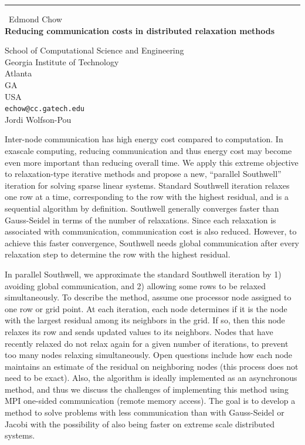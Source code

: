 \documentclass{report}
\begin{document}
\begin{center}
\rule{6in}{1pt} \
{\large Edmond Chow \\
{\bf Reducing communication costs in distributed relaxation methods}}

School of Computational Science and Engineering \\ Georgia Institute of Technology \\ Atlanta \\ GA \\ USA
\\
{\tt echow@cc.gatech.edu}\\
Jordi Wolfson-Pou\end{center}

Inter-node communication has high energy cost compared to computation.
In exascale computing, reducing communication and thus energy cost may
become even more important than reducing overall time. We apply this
extreme objective to relaxation-type iterative methods and propose a new,
``parallel Southwell'' iteration for solving sparse linear systems.
Standard Southwell iteration relaxes one row at a time, corresponding
to the row with the highest residual, and is a sequential algorithm by
definition. Southwell generally converges faster than Gauss-Seidel in
terms of the number of relaxations. Since each relaxation is associated with
communication, communication cost is also reduced. However, to achieve
this faster convergence, Southwell needs global communication after
every relaxation step to determine the row with the highest residual.

In parallel Southwell, we approximate the standard Southwell iteration
by 1) avoiding global communication, and 2) allowing some rows to be
relaxed simultaneously. To describe the method, assume one processor
node assigned to one row or grid point. At each iteration, each node
determines if it is the node with the largest residual among its
neighbors in the grid. If so, then this node relaxes its row and sends
updated values to its neighbors. Nodes that have recently relaxed
do not relax again for a given number of iterations, to prevent too
many nodes relaxing simultaneously. Open questions include how each
node maintains an estimate of the residual on neighboring nodes (this
process does not need to be exact). Also, the algorithm is ideally
implemented as an asynchronous method, and thus we discuss the challenges
of implementing this method using MPI one-sided communication (remote
memory access). The goal is to develop a method to solve problems with
less communication than with Gauss-Seidel or Jacobi with the possibility
of also being faster on extreme scale distributed systems.
\end{document}
